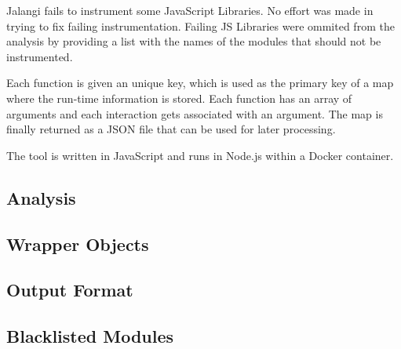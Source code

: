 Jalangi fails to instrument some JavaScript Libraries. No effort was made in trying to fix failing instrumentation. Failing JS Libraries were ommited from the analysis by providing a list with the names of the modules that should not be instrumented.

Each function is given an unique key, which is used as the primary key of a map where the run-time information is stored. Each function has an array of arguments and each interaction gets associated with an argument. The map is finally returned as a JSON file that can be used for later processing.

The tool is written in JavaScript and runs in Node.js within a Docker container.



\subsection{Analysis} \label{run-time-analysis}









\subsection{Wrapper Objects}

\subsection{Output Format}

\subsection{Blacklisted Modules}


